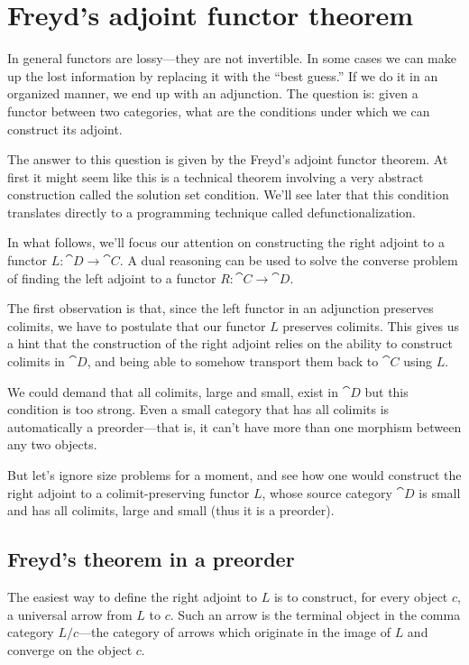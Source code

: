 \documentclass[DaoFP]{subfiles}
\begin{document}
\section{Freyd's adjoint functor theorem}

In general functors are lossy---they are not invertible. In some cases we can make up the lost information by replacing it with the ``best guess.'' If we do it in an organized manner, we end up with an adjunction. The question is: given a functor between two categories, what are the conditions under which we can construct its adjoint. 

The answer to this question is given by the Freyd's adjoint functor theorem. At first it might seem like this is a technical theorem involving a very abstract construction called the solution set condition. We'll see later that this condition translates directly to a programming technique called defunctionalization. 

In what follows, we'll focus our attention on constructing the right adjoint to a functor $L \colon \cat D \to \cat C$. A dual reasoning can be used to solve the converse problem of finding the left adjoint to a functor $R \colon \cat C \to \cat D$.

The first observation is that, since the left functor in an adjunction preserves colimits, we have to postulate that our functor $L$  preserves colimits. This gives us a hint that the construction of the right adjoint relies on the ability to construct colimits in $\cat D$, and being able to somehow transport them back to $\cat C$ using $L$. 

We could demand that all colimits, large and small, exist in $\cat D$ but this condition is too strong. Even a small category that has all colimits is automatically a preorder---that is, it can't have more than one morphism between any two objects. 

But let's ignore size problems for a moment, and see how one would construct the right adjoint to a colimit-preserving functor $L$, whose source category $\cat D$ is small and has all colimits, large and small (thus it is a preorder).

\subsection{Freyd's theorem in a preorder}

The easiest way to define the right adjoint to $L$ is to construct, for every object $c$, a universal arrow from $L$ to $c$. Such an arrow is the terminal object in the comma category $L/c$---the category of arrows which originate in the image of $L$ and converge on the object $c$.
\end{document}
